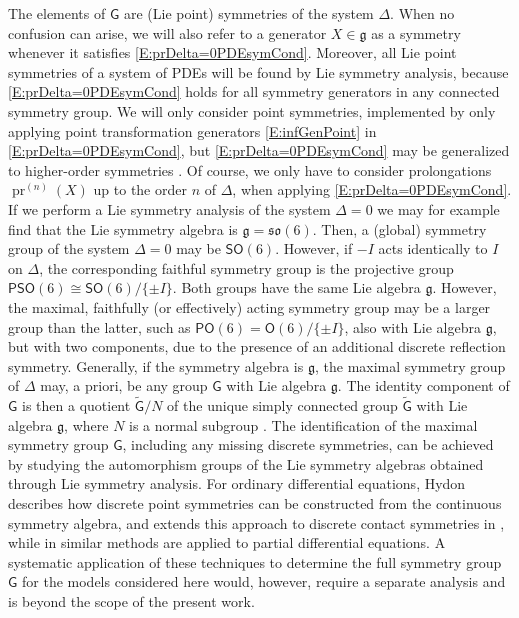 \documentclass[a4paper,hidelinks, 12pt]{article}
\numberwithin{equation}{section}
\theoremstyle{plain}
\newcommand{\La}{\mathfrak}
\newcommand{\Lg}{\mathsf}
\newcommand{\on}{\operatorname}
\begin{document}
The elements of $\Lg{G}$ are (Lie point) symmetries of the system $\Delta$.
When no confusion can arise, we will also refer to a generator
$X \in \La{g}$ as a symmetry whenever it satisfies
\eqref{E:prDelta=0PDEsymCond}.
 Moreover, all Lie point symmetries
of a system of PDEs will be found by Lie symmetry analysis,
because \eqref{E:prDelta=0PDEsymCond} holds for all symmetry generators in any connected symmetry group. We will only consider point symmetries, implemented by only applying point transformation generators \eqref{E:infGenPoint} in \eqref{E:prDelta=0PDEsymCond}, but \eqref{E:prDelta=0PDEsymCond} may be generalized to higher-order symmetries \cite{OlverLecturesLGaDE}.
Of course, 
we only 
have to consider prolongations $\on{pr}^{(n)}(X)$ up to the order $n$ of $\Delta$, when applying \eqref{E:prDelta=0PDEsymCond}. 
 If we perform a Lie symmetry analysis of the system $\Delta=0$
we may for example find that the Lie symmetry algebra %
is $\La{g}=\La{so}(6)$. Then, 
a (global) symmetry group of the system
 $\Delta=0$ may be $\Lg{SO}(6)$. However, if 
$-I$ acts identically to $I$ on $\Delta$, the corresponding faithful symmetry group is the projective group $\Lg{PSO}(6)\cong \Lg{SO}(6)/\{\pm I\}$. Both groups have the same Lie algebra 
$\La{g}$. However, the maximal, faithfully (or effectively) acting symmetry group may be a larger group than the latter, such as $\Lg{PO}(6)=\Lg{O}(6)/\{\pm I\}$, also with Lie algebra $\La{g}$, but with two components, due to the presence of an additional discrete reflection symmetry. Generally, if the symmetry algebra is $\La{g}$, the maximal symmetry group of $\Delta$ may, a priori, be any group $\Lg{G}$ with Lie algebra $\La{g}$. The identity component of $\Lg{G}$ is then a quotient 
$\tilde{\Lg{G}}/N$ of the unique simply connected group $\tilde{\Lg{G}}$ with Lie algebra $\La{g}$, where $N$ is a normal subgroup
\cite{kunzinger2024lietransformationgroups}.
The identification of the maximal symmetry group $\Lg{G}$, including any
missing discrete symmetries, can be achieved by studying the automorphism
groups of the Lie symmetry algebras obtained through Lie symmetry analysis.
For ordinary differential equations, Hydon \cite{hydon1998discrete}
describes how discrete point symmetries can be constructed from the continuous
symmetry algebra, and extends this approach to discrete contact symmetries in
\cite{hydon1998find}, while in \cite{hydon2000construct} similar methods are
applied to partial differential equations. A systematic application of these
techniques to determine the full symmetry group $\Lg{G}$ for the models
considered here would, however, require a separate analysis and is beyond the
scope of the present work.
\end{document}
